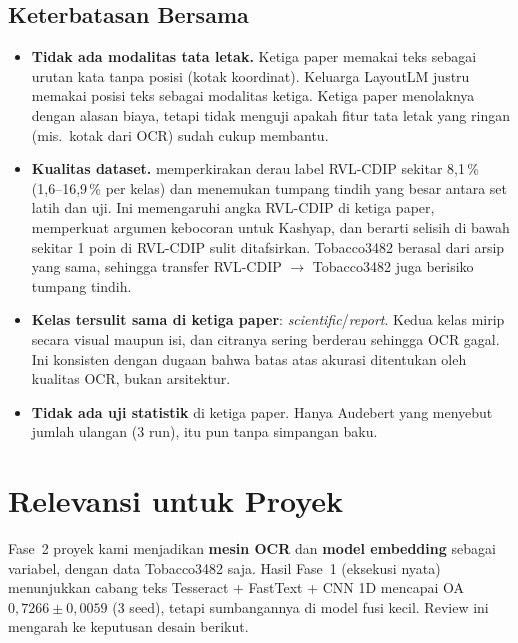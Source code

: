 \subsection{Keterbatasan Bersama}
\begin{itemize}
  \item \textbf{Tidak ada modalitas tata letak.} Ketiga paper memakai teks sebagai urutan kata
        tanpa posisi (kotak koordinat). Keluarga LayoutLM justru memakai posisi teks sebagai
        modalitas ketiga. Ketiga paper menolaknya dengan alasan biaya, tetapi tidak menguji
        apakah fitur tata letak yang ringan (mis.\ kotak dari OCR) sudah cukup membantu.
  \item \textbf{Kualitas dataset.} \textcite{larson2023} memperkirakan derau label RVL-CDIP
        sekitar 8,1\,\% (1,6--16,9\,\% per kelas) dan menemukan tumpang tindih yang besar
        antara set latih dan uji. Ini memengaruhi angka RVL-CDIP di ketiga paper,
        memperkuat argumen kebocoran untuk Kashyap, dan berarti selisih di bawah sekitar
        1 poin di RVL-CDIP sulit ditafsirkan. Tobacco3482 berasal dari arsip yang sama,
        sehingga transfer RVL-CDIP $\to$ Tobacco3482 juga berisiko tumpang tindih.
  \item \textbf{Kelas tersulit sama di ketiga paper}: \emph{scientific}/\emph{report}.
        Kedua kelas mirip secara visual maupun isi, dan citranya sering berderau sehingga
        OCR gagal. Ini konsisten dengan dugaan bahwa batas atas akurasi ditentukan oleh
        kualitas OCR, bukan arsitektur.
  \item \textbf{Tidak ada uji statistik} di ketiga paper. Hanya Audebert yang menyebut
        jumlah ulangan (3 run), itu pun tanpa simpangan baku.
\end{itemize}

\section{Relevansi untuk Proyek}\label{sec:relevansi}

Fase~2 proyek kami menjadikan \textbf{mesin OCR} dan \textbf{model embedding} sebagai
variabel, dengan data Tobacco3482 saja. Hasil Fase~1 (eksekusi nyata) menunjukkan cabang
teks Tesseract + FastText + CNN 1D mencapai OA $0{,}7266 \pm 0{,}0059$ (3 seed), tetapi
sumbangannya di model fusi kecil. Review ini mengarah ke keputusan desain berikut.

